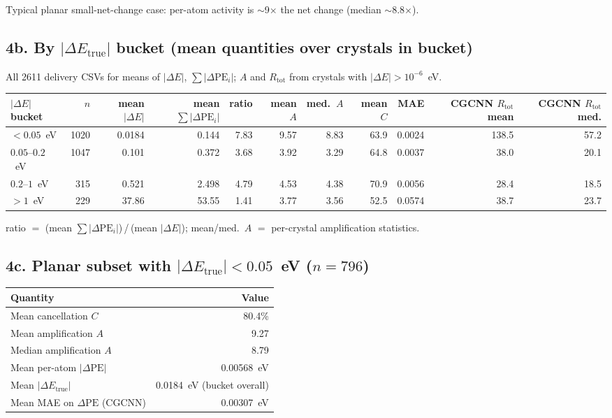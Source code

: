 \documentclass[11pt,a4paper]{article}
\begin{document}
\noindent Typical planar small-net-change case: per-atom activity is $\sim$9$\times$ the net change (median $\sim$8.8$\times$).

\subsection*{4b. By $|\Delta E_{\mathrm{true}}|$ bucket (mean quantities over crystals in bucket)}

All 2611 delivery CSVs for means of $|\Delta E|$, $\sum|\Delta\mathrm{PE}_i|$; $A$ and $R_{\mathrm{tot}}$ from crystals with $|\Delta E|>10^{-6}$~eV.

\begin{center}
\footnotesize
\setlength{\tabcolsep}{5pt}
\begin{tabular}{@{}l *{10}{r} @{}}
  \toprule
  $|\Delta E|$ bucket & $n$ & mean $|\Delta E|$ & mean $\sum|\Delta\mathrm{PE}_i|$ & ratio & mean $A$ & med.\ $A$ & mean $C$ & MAE & CGCNN $R_{\mathrm{tot}}$ mean & CGCNN $R_{\mathrm{tot}}$ med. \\
  \midrule
  $<0.05$~eV       & 1020 & 0.0184 & 0.144 & 7.83 & 9.57 & 8.83 & 63.9 & 0.0024 & 138.5 & 57.2 \\
  $0.05$--$0.2$~eV & 1047 & 0.101  & 0.372 & 3.68 & 3.92 & 3.29 & 64.8 & 0.0037 &  38.0 & 20.1 \\
  $0.2$--$1$~eV    &  315 & 0.521  & 2.498 & 4.79 & 4.53 & 4.38 & 70.9 & 0.0056 &  28.4 & 18.5 \\
  $>1$~eV          &  229 & 37.86  & 53.55 & 1.41 & 3.77 & 3.56 & 52.5 & 0.0574 &  38.7 & 23.7 \\
  \bottomrule
\end{tabular}
\end{center}

\noindent ratio $=$ (mean $\sum|\Delta\mathrm{PE}_i|$)\,/\,(mean $|\Delta E|$); mean/med.\ $A$ $=$ per-crystal amplification statistics.

\subsection*{4c. Planar subset with $|\Delta E_{\mathrm{true}}|<0.05$~eV ($n=796$)}

\begin{center}
\begin{tabular}{lr}
  \toprule
  Quantity & Value \\
  \midrule
  Mean cancellation $C$ & 80.4\% \\
  Mean amplification $A$ & 9.27 \\
  Median amplification $A$ & 8.79 \\
  Mean per-atom $|\Delta\mathrm{PE}|$ & 0.00568~eV \\
  Mean $|\Delta E_{\mathrm{true}}|$ & 0.0184~eV (bucket overall) \\
  Mean MAE on $\Delta\mathrm{PE}$ (CGCNN) & 0.00307~eV \\
  \bottomrule
\end{tabular}
\end{center}
\end{document}
